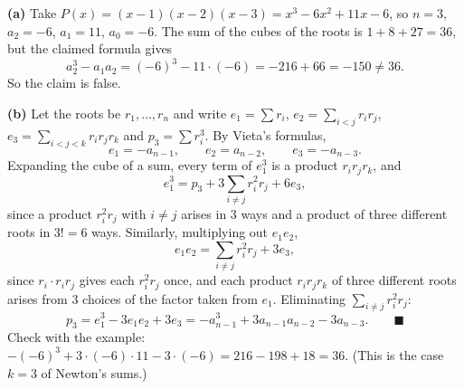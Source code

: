 \textbf{(a)} Take $P(x)=(x-1)(x-2)(x-3)=x^3-6x^2+11x-6$, so $n=3$, $a_2=-6$, $a_1=11$, $a_0=-6$. The sum of the cubes of the roots is $1+8+27=36$, but the claimed formula gives
\[
a_2^3-a_1a_2=(-6)^3-11\cdot(-6)=-216+66=-150\ne36 .
\]
So the claim is false.

\textbf{(b)} Let the roots be $r_1,\dots,r_n$ and write $e_1=\sum r_i$, $e_2=\sum_{i<j}r_ir_j$, $e_3=\sum_{i<j<k}r_ir_jr_k$ and $p_3=\sum r_i^3$. By Vieta's formulas,
\[
e_1=-a_{n-1},\qquad e_2=a_{n-2},\qquad e_3=-a_{n-3}.
\]
Expanding the cube of a sum, every term of $e_1^3$ is a product $r_ir_jr_k$, and
\[
e_1^3=p_3+3\sum_{i\ne j}r_i^2r_j+6e_3,
\]
since a product $r_i^2r_j$ with $i\ne j$ arises in $3$ ways and a product of three different roots in $3!=6$ ways. Similarly, multiplying out $e_1e_2$,
\[
e_1e_2=\sum_{i\ne j}r_i^2r_j+3e_3,
\]
since $r_i\cdot r_ir_j$ gives each $r_i^2r_j$ once, and each product $r_ir_jr_k$ of three different roots arises from $3$ choices of the factor taken from $e_1$. Eliminating $\sum_{i\ne j}r_i^2r_j$:
\[
p_3=e_1^3-3e_1e_2+3e_3=-a_{n-1}^3+3a_{n-1}a_{n-2}-3a_{n-3}.\qquad\blacksquare
\]
Check with the example: $-(-6)^3+3\cdot(-6)\cdot11-3\cdot(-6)=216-198+18=36$. (This is the case $k=3$ of Newton's sums.)
